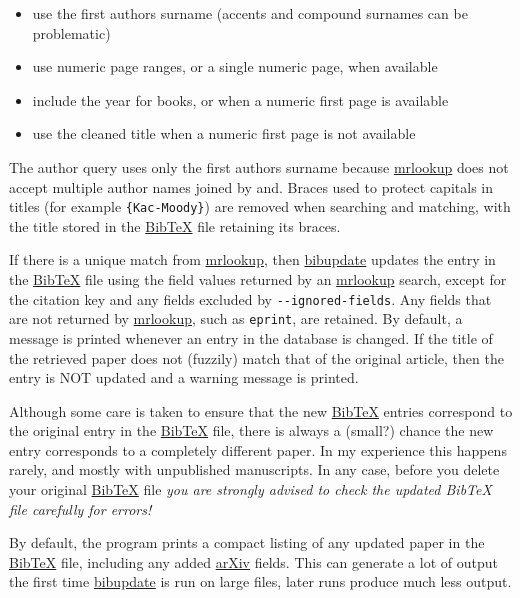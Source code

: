 \documentclass{amsart}
\providecommand{\tightlist}{\setlength{\itemsep}{0pt}\setlength{\parskip}{0pt}}
\begin{document}
\begin{itemize}
\tightlist
\item
  use the first author\textquotesingle s surname (accents and compound
  surnames can be problematic)
\item
  use numeric page ranges, or a single numeric page, when available
\item
  include the year for books, or when a numeric first page is available
\item
  use the cleaned title when a numeric first page is not available
\end{itemize}

The author query uses only the first author\textquotesingle s surname
because
\href{https://mathscinet.ams.org/mathscinet/freetools/mrlookup}{mrlookup}
does not accept multiple author names joined by
\textquotesingle and\textquotesingle. Braces used to protect capitals in
titles (for example \texttt{\{Kac-Moody\}}) are removed when searching
and matching, with the title stored in the
\href{http://www.bibtex.org/}{BibTeX} file retaining its braces.

If there is a unique match from
\href{https://mathscinet.ams.org/mathscinet/freetools/mrlookup}{mrlookup},
then \href{https://github.com/AndrewMathas/BibUpdate}{bibupdate} updates
the entry in the \href{http://www.bibtex.org/}{BibTeX} file using the
field values returned by an
\href{https://mathscinet.ams.org/mathscinet/freetools/mrlookup}{mrlookup}
search, except for the citation key and any fields excluded by
\texttt{-\/-ignored-fields}. Any fields that are not returned by
\href{https://mathscinet.ams.org/mathscinet/freetools/mrlookup}{mrlookup},
such as \texttt{eprint}, are retained. By default, a message is printed
whenever an entry in the database is changed. If the title of the
retrieved paper does not (fuzzily) match that of the original article,
then the entry is NOT updated and a warning message is printed.

Although some care is taken to ensure that the new
\href{http://www.bibtex.org/}{BibTeX} entries correspond to the original
entry in the \href{http://www.bibtex.org/}{BibTeX} file, there is always
a (small?) chance the new entry corresponds to a completely different
paper. In my experience this happens rarely, and mostly with unpublished
manuscripts. In any case, before you delete your original
\href{http://www.bibtex.org/}{BibTeX} file \emph{you are strongly
advised to check the updated BibTeX file carefully for errors!}

By default, the program prints a compact listing of any updated paper in
the \href{http://www.bibtex.org/}{BibTeX} file, including any added
\href{http://arxiv.org/}{arXiv} fields. This can generate a lot of
output the first time
\href{https://github.com/AndrewMathas/BibUpdate}{bibupdate} is run on
large files, later runs produce much less output.
\end{document}
